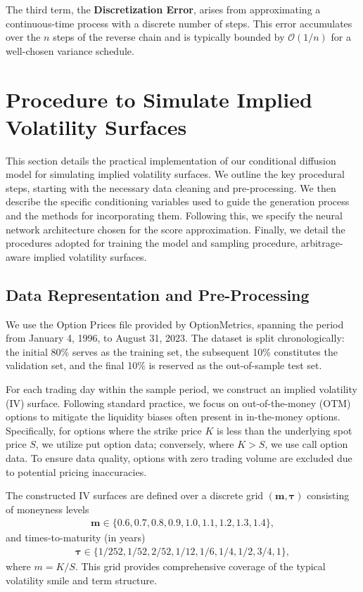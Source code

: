 \documentclass{article}
\newcommand{\eqstar}[1]{\begin{align*}#1\end{align*}}
\begin{document}
The third term, the \textbf{Discretization Error}, arises from approximating a continuous-time process with a discrete number of steps. This error accumulates over the $n$ steps of the reverse chain and is typically bounded by $\mathcal{O}(1/n)$ for a well-chosen variance schedule.

\section{Procedure to Simulate Implied Volatility Surfaces}
\label{sec:procedure}
This section details the practical implementation of our conditional diffusion model for simulating implied volatility surfaces. We outline the key procedural steps, starting with the necessary data cleaning and pre-processing. We then describe the specific conditioning variables used to guide the generation process and the methods for incorporating them. Following this, we specify the neural network architecture chosen for the score approximation. Finally, we detail the procedures adopted for training the model and sampling procedure, arbitrage-aware implied volatility surfaces.

\subsection{Data Representation and Pre-Processing}

We use the Option Prices file provided by OptionMetrics, spanning the period from January 4, 1996, to August 31, 2023. The dataset is split chronologically: the initial 80\% serves as the training set, the subsequent 10\% constitutes the validation set, and the final 10\% is reserved as the out-of-sample test set.

For each trading day within the sample period, we construct an implied volatility (IV) surface. Following standard practice, we focus on out-of-the-money (OTM) options to mitigate the liquidity biases often present in in-the-money options. Specifically, for options where the strike price $K$ is less than the underlying spot price $S$, we utilize put option data; conversely, where $K > S$, we use call option data. To ensure data quality, options with zero trading volume are excluded due to potential pricing inaccuracies.

The constructed IV surfaces are defined over a discrete grid $(\mathbf{m}, \mathbf{\tau})$ consisting of moneyness levels 
\eqstar{\mathbf{m} \in \{0.6, 0.7, 0.8, 0.9, 1.0, 1.1, 1.2, 1.3, 1.4\},
} 
and times-to-maturity (in years) 
\eqstar{
\mathbf{\tau} \in \{1/252, 1/52, 2/52, 1/12, 1/6, 1/4, 1/2, 3/4, 1\},} where $m=K/S$. This grid provides comprehensive coverage of the typical volatility smile and term structure.
\end{document}
